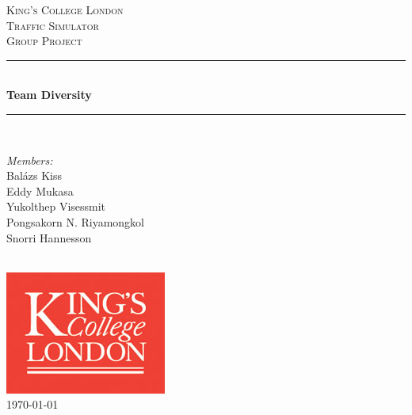 \documentclass[11pt]{article}
\begin{document}

\begin{titlepage}

\newcommand{\HRule}{\rule{\linewidth}{0.5mm}}
\center
\textsc{\LARGE King's College London}\\[1.5cm]
\textsc{\Large Traffic Simulator}\\[0.5cm]
\textsc{\large Group Project}\\[0.5cm]
\HRule \\[0.4cm]
{ \huge \bfseries Team Diversity}\\[0.4cm]
\HRule \\[1.5cm]

\begin{minipage}{0.4\textwidth} \large
\begin{center}
\emph{Members:}\\
Balázs Kiss \\
Eddy Mukasa \\
Yukolthep Visessmit \\
Pongsakorn N. Riyamongkol \\
Snorri Hannesson
\end{center}
\end{minipage}
\\[2cm]

\includegraphics{KingsLogo}\\[1cm] 

{\large \today}\\[3cm]

\vfill

\end{titlepage}


\tableofcontents
\newpage
\end{document}
